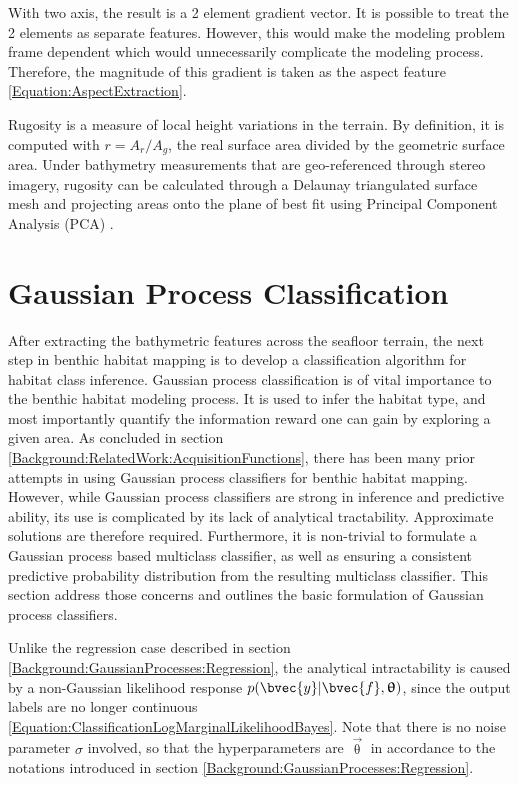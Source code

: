 			With two axis, the result is a 2 element gradient vector. It is possible to treat the 2 elements as separate features. However, this would make the modeling problem frame dependent which would unnecessarily complicate the modeling process. Therefore, the magnitude of this gradient is taken as the aspect feature \eqref{Equation:AspectExtraction}. 
			
			Rugosity is a measure of local height variations in the terrain. By definition, it is computed with $r = A_{r}/A_{g}$, the real surface area divided by the geometric surface area. Under bathymetry measurements that are geo-referenced through stereo imagery, rugosity can be calculated through a Delaunay triangulated surface mesh and projecting areas onto the plane of best fit using Principal Component Analysis (PCA) \citep{Friedman:Rugosity}.
							
			\FloatBarrier
				
	\section{Gaussian Process Classification}
	\label{BenthicHabitatMapping:Classification}
	
		After extracting the bathymetric features across the seafloor terrain, the next step in benthic habitat mapping is to develop a classification algorithm for habitat class inference. Gaussian process classification is of vital importance to the benthic habitat modeling process. It is used to infer the habitat type, and most importantly quantify the information reward one can gain by exploring a given area. As concluded in section \ref{Background:RelatedWork:AcquisitionFunctions}, there has been many prior attempts in using Gaussian process classifiers for benthic habitat mapping. However, while Gaussian process classifiers are strong in inference and predictive ability, its use is complicated by its lack of analytical tractability. Approximate solutions are therefore required. Furthermore, it is non-trivial to formulate a Gaussian process based multiclass classifier, as well as ensuring a consistent predictive probability distribution from the resulting multiclass classifier. This section address those concerns and outlines the basic formulation of Gaussian process classifiers.
		
		Unlike the regression case described in section \ref{Background:GaussianProcesses:Regression}, the analytical intractability is caused by a non-Gaussian likelihood response $p(\bvec{y} | \bvec{f}, \vec{\uptheta})$, since the output labels are no longer continuous \eqref{Equation:ClassificationLogMarginalLikelihoodBayes}. Note that there is no noise parameter $\sigma$ involved, so that the hyperparameters are $\vec{\uptheta}$ in accordance to the notations introduced in section \ref{Background:GaussianProcesses:Regression}.

